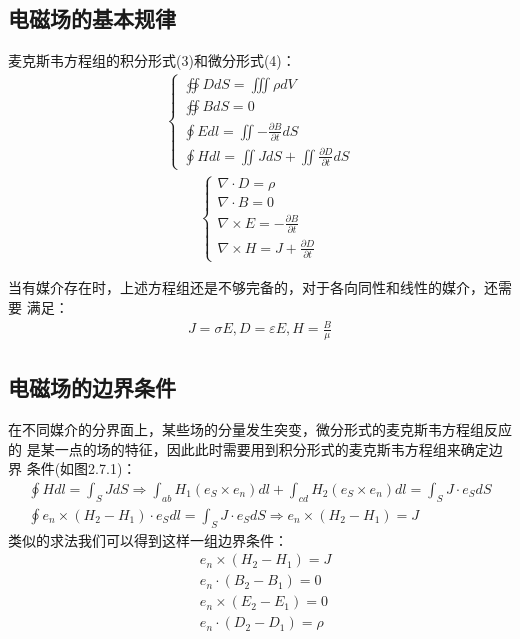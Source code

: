 \documentclass[UTF8]{article}
\begin{document}
\subsection{电磁场的基本规律}
麦克斯韦方程组的积分形式(3)和微分形式(4)：
\begin{align}
    \begin{cases}
        \oiint D dS  =\iiint \rho dV                        \\
        \oiint B dS =0                                      \\
        \oint  E dl =\iint -\frac{\partial B}{\partial t}dS \\
        \oint H dl=\iint JdS+\iint \frac{\partial D}{\partial t}dS
    \end{cases}
\end{align}
\begin{align}
    \begin{cases}
        \nabla \cdot D  =\rho                           \\
        \nabla \cdot B  =0                              \\
        \nabla \times E =-\frac{\partial B}{\partial t} \\
        \nabla \times H =J+\frac{\partial D}{\partial t}
    \end{cases}
\end{align}


当有媒介存在时，上述方程组还是不够完备的，对于各向同性和线性的媒介，还需要
满足：
\begin{align}
    J = \sigma E,D = \varepsilon E ,H = \frac{B}{\mu}
\end{align}

\subsection{电磁场的边界条件}
在不同媒介的分界面上，某些场的分量发生突变，微分形式的麦克斯韦方程组反应的
是某一点的场的特征，因此此时需要用到积分形式的麦克斯韦方程组来确定边界
条件(如图2.7.1)：
\begin{align}
    \oint H dl =\int _S JdS \Rightarrow 
    \int _{ab} H_1 (e_S\times e_n)dl +\int _{cd} H_2(e_S\times e_n)dl
    =\int _S J \cdot e_S dS \\
    \oint e_n\times (H_2-H_1) \cdot e_S dl
    = \int _S J \cdot e_S dS \Rightarrow e_n\times(H_2-H_1)=J
\end{align}
类似的求法我们可以得到这样一组边界条件：
\begin{align}
    &e_n \times (H_2-H_1) = J \\
    &e_n \cdot (B_2-B_1)=0    \\
    &e_n \times (E_2-E_1)=0   \\
    &e_n \cdot (D_2-D_1)=\rho
\end{align}
\newpage
\end{document}
